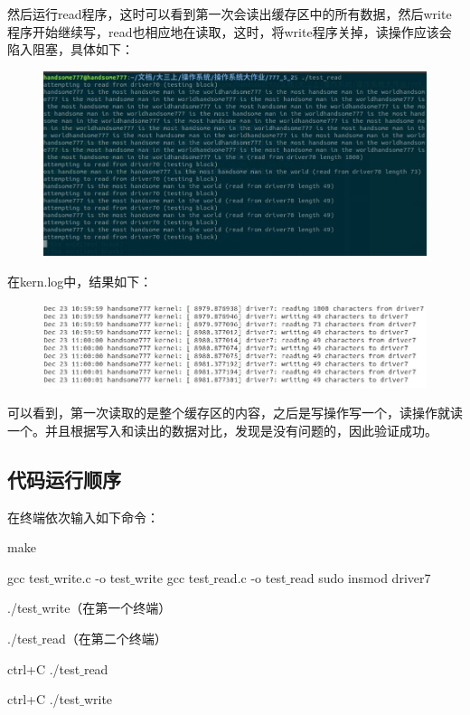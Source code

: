 \documentclass[UTF8]{ctexart}
\begin{document}
然后运行read程序，这时可以看到第一次会读出缓存区中的所有数据，然后write程序开始继续写，read也相应地在读取，这时，将write程序关掉，读操作应该会陷入阻塞，具体如下：\newpage
\begin{figure}[!h]
\centering
\includegraphics[scale = 0.7,bb=0 0 683 330]{5_9.jpg}
\label{img12}
\end{figure}
在kern.log中，结果如下：\par
\begin{figure}[!h]
\centering
\includegraphics[scale = 0.7,bb=0 0 627 138]{5_10.jpg}
\label{img13}
\end{figure}
可以看到，第一次读取的是整个缓存区的内容，之后是写操作写一个，读操作就读一个。并且根据写入和读出的数据对比，发现是没有问题的，因此验证成功。

\subsection{代码运行顺序}
在终端依次输入如下命令：\par
make\par
gcc test$\_$write.c -o test$\_$write
gcc test$\_$read.c -o test$\_$read
sudo insmod driver7\par
./test$\_$write（在第一个终端）\par
./test$\_$read（在第二个终端）\par
ctrl+C ./test$\_$read\par
ctrl+C ./test$\_$write\par
\end{document}
